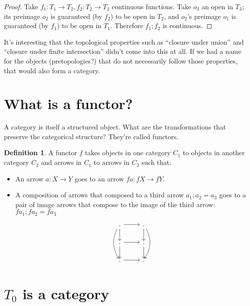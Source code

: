 \documentclass{proc-l}
\theoremstyle{definition}
\newtheorem{definition}[theorem]{Definition}
\theoremstyle{remark}
\numberwithin{equation}{section}
\begin{document}
\begin{proof}
Take $f_1 : T_1 \rightarrow T_2, f_2 : T_2 \rightarrow T_3$ continuous functions. Take $o_3$ an open in $T_3$; its preimage $o_2$ is guaranteed (by $f_2$) to be open in $T_2$, and $o_2$'s preimage $o_1$ is guaranteed (by $f_1$) to be open in $T_1$. Therefore $f_1 ; f_2$ is continuous.
\end{proof}

It's interesting that the topological properties such as ``closure under union'' and ``closure under finite intersection'' didn't come into this at all. If we had a name for the objects (pretopologies?) that do not necessarily follow those properties, that would also form a category.

\section{What is a functor?}

A category is itself a structured object. What are the transformations that preserve the categorical structure? They're called functors.

\begin{definition}
\label{functordefn}
A functor $f$ takes objects in one category $C_1$ to objects in another category $C_2$ and arrows in $C_1$ to arrows in $C_2$ such that:
\begin{itemize}

\item An arrow $a : X \rightarrow Y$ goes to an arrow $f a : f X \rightarrow f Y$.

\item A composition of arrows that composed to a third arrow $a_1 ; a_2 = a_3$ goes to a pair of image arrows that compose to the image of the third arrow: $f a_1 ; f a_2 = f a_3$

\[
\begin{tikzcd}
. \arrow[d] \arrow[dd, bend right] \arrow[r] & . \arrow[d] \arrow[dd, bend left] \\
. \arrow[d] \arrow[r] & . \arrow[d] \\
. \arrow[r] & .
\end{tikzcd}
\]

\end{itemize}
\end{definition}

\section{$T_0$ is a category}
\end{document}
